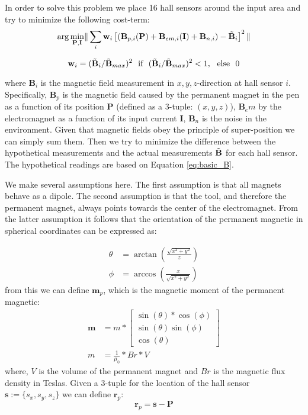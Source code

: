 In order to solve this problem we place 16 hall sensors around the input area and try to minimize the following cost-term:
\begin{equation}
    \arg\underset{\mathbf{P}, \mathbf{I}}{\min} \|\sum_i \mathbf{w}_{i} \left[(\mathbf{B}_{p,i}(\mathbf{P})+\mathbf{B}_{em,i}(\mathbf{I}) + \mathbf{B}_{n,i}) - \Tilde{\mathbf{B}}_i\right]^2 \|
    \label{eq:eneregy}
\end{equation}

\begin{equation}
    \mathbf{w}_{i} = (\Tilde{\mathbf{B}}_i/ \Tilde{\mathbf{B}}_{max})^2 \ \  
                \text{if}\ \ (\Tilde{\mathbf{B}}_i/ \Tilde{\mathbf{B}}_{max})^2 < 1,\ \ \text{else}\ \ 0
\end{equation}

where $\mathbf{B}_i$ is the magnetic field measurement in $x,y,z$-direction at hall sensor $i$. Specifically, $\mathbf{B}_p$ is the magnetic field caused by the permanent magnet in the pen as a function of its position $\mathbf{P}$ (defined as a 3-tuple: $(x,y,z)$), $\mathbf{B}_em$ by the electromagnet as a function of its input current $\mathbf{I}$, $\mathbf{B}_n$ is the noise in the environment. Given that magnetic fields obey the principle of super-position we can simply sum them. Then we try to minimize the difference between the hypothetical measurements and the actual measurements $\Tilde{\mathbf{B}}$ for each hall sensor. The hypothetical readings are based on Equation \ref{eq:basic_B}. 

We make several assumptions here. The first assumption is that all magnets behave as a dipole. The second assumption is that the tool, and therefore the permanent magnet, always points towards the center of the electromagnet. From the latter assumption it follows that the orientation of the permanent magnetic in spherical coordinates can be expressed as:

\begin{align}
    \theta &= \arctan \left( \frac{\sqrt{x^2+y^2}}{z}\right)\\
    \phi &= \arccos \left( \frac{x}{\sqrt{x^2+y^2}} \right)
\end{align}
from this we can define $\mathbf{m}_p$, which is the magnetic moment of the permanent magnetic:
\begin{align}
    \mathbf{m} &= m * \begin{bmatrix}\sin(\theta)*\cos(\phi)\\\sin(\theta)\sin(\phi)\\\cos(\theta)\end{bmatrix}\\
    m &= \frac{1}{\mu_0}*Br*V
\end{align}
where, $V$ is the volume of the permanent magnet and $Br$ is the magnetic flux density in Teslas. Given a 3-tuple for the location of the hall sensor $\mathbf{s} := \{s_x, s_y, s_z\}$ we can define $\mathbf{r}_p$:
\begin{equation}
    \mathbf{r}_p = \mathbf{s} - \mathbf{P}
\end{equation}

